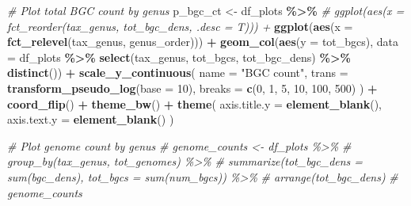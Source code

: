 \documentclass[
]{article}
\newenvironment{Shaded}{\begin{snugshade}}{\end{snugshade}}
\newcommand{\AttributeTok}[1]{\textcolor[rgb]{0.13,0.29,0.53}{#1}}
\newcommand{\CommentTok}[1]{\textcolor[rgb]{0.56,0.35,0.01}{\textit{#1}}}
\newcommand{\DecValTok}[1]{\textcolor[rgb]{0.00,0.00,0.81}{#1}}
\newcommand{\FunctionTok}[1]{\textcolor[rgb]{0.13,0.29,0.53}{\textbf{#1}}}
\newcommand{\NormalTok}[1]{#1}
\newcommand{\OtherTok}[1]{\textcolor[rgb]{0.56,0.35,0.01}{#1}}
\newcommand{\SpecialCharTok}[1]{\textcolor[rgb]{0.81,0.36,0.00}{\textbf{#1}}}
\newcommand{\StringTok}[1]{\textcolor[rgb]{0.31,0.60,0.02}{#1}}
\begin{document}
\begin{Shaded}
\begin{Highlighting}[]
\CommentTok{\# Plot total BGC count by genus}
\NormalTok{p\_bgc\_ct }\OtherTok{\textless{}{-}}\NormalTok{ df\_plots }\SpecialCharTok{\%\textgreater{}\%}
  \CommentTok{\# ggplot(aes(x = fct\_reorder(tax\_genus, tot\_bgc\_dens, .desc = T))) +}
  \FunctionTok{ggplot}\NormalTok{(}\FunctionTok{aes}\NormalTok{(}\AttributeTok{x =} \FunctionTok{fct\_relevel}\NormalTok{(tax\_genus, genus\_order))) }\SpecialCharTok{+}
  \FunctionTok{geom\_col}\NormalTok{(}\FunctionTok{aes}\NormalTok{(}\AttributeTok{y =}\NormalTok{ tot\_bgcs), }\AttributeTok{data =}\NormalTok{ df\_plots }\SpecialCharTok{\%\textgreater{}\%} \FunctionTok{select}\NormalTok{(tax\_genus, tot\_bgcs, tot\_bgc\_dens) }\SpecialCharTok{\%\textgreater{}\%} \FunctionTok{distinct}\NormalTok{()) }\SpecialCharTok{+}
  \FunctionTok{scale\_y\_continuous}\NormalTok{(}
    \AttributeTok{name =} \StringTok{"BGC count"}\NormalTok{,}
    \AttributeTok{trans =} \FunctionTok{transform\_pseudo\_log}\NormalTok{(}\AttributeTok{base =} \DecValTok{10}\NormalTok{),}
    \AttributeTok{breaks =} \FunctionTok{c}\NormalTok{(}\DecValTok{0}\NormalTok{, }\DecValTok{1}\NormalTok{, }\DecValTok{5}\NormalTok{, }\DecValTok{10}\NormalTok{, }\DecValTok{100}\NormalTok{, }\DecValTok{500}\NormalTok{)}
\NormalTok{  ) }\SpecialCharTok{+}
  \FunctionTok{coord\_flip}\NormalTok{() }\SpecialCharTok{+}
  \FunctionTok{theme\_bw}\NormalTok{() }\SpecialCharTok{+}
  \FunctionTok{theme}\NormalTok{(}
    \AttributeTok{axis.title.y =} \FunctionTok{element\_blank}\NormalTok{(),}
    \AttributeTok{axis.text.y =} \FunctionTok{element\_blank}\NormalTok{()}
\NormalTok{  )}

\CommentTok{\# Plot genome count by genus}
\CommentTok{\# genome\_counts \textless{}{-} df\_plots \%\textgreater{}\%}
\CommentTok{\#   group\_by(tax\_genus, tot\_genomes) \%\textgreater{}\%}
\CommentTok{\#   summarize(tot\_bgc\_dens = sum(bgc\_dens), tot\_bgcs = sum(num\_bgcs)) \%\textgreater{}\%}
\CommentTok{\#   arrange(tot\_bgc\_dens)}
\CommentTok{\# genome\_counts}


\end{Highlighting}
\end{Shaded}
\end{document}
